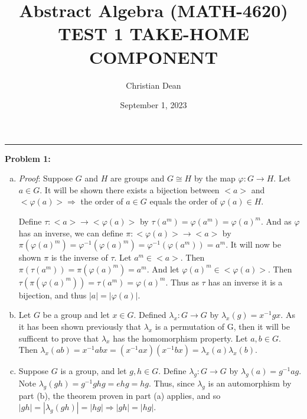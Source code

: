 \documentclass[12pt, letterpaper]{article}
\title{Abstract Algebra (MATH-4620) TEST 1 TAKE-HOME COMPONENT}
\author{Christian Dean}
\date{September 1, 2023}
\newenvironment{problem}
    [1]
    {\noindent \textbf{Problem #1:}}
    {\vspace{3mm}}
\begin{document}
\maketitle

\noindent\hfil\rule{16cm}{0.4pt}\hfil

\begin{problem}{1}
    \begin{enumerate}[(a)]
        \item \emph{Proof}: Suppose $G$ and $H$ are groups and $G \cong H$ by the map
        $\varphi: G \rightarrow H$. Let $a \in G$. It will be shown there exists a bijection 
        between ${<}a{>}$ and ${<}\varphi(a){>} \Rightarrow$ the order of $a \in G$ equals 
        the order of $\varphi(a) \in H$.

        \bigskip\noindent
        Define $\tau: {<}a{>} \rightarrow {<}\varphi(a){>}$ by $\tau(a^m) = \varphi(a^m) =
        \varphi(a)^m$. And as $\varphi$ has an inverse, we can define 
        $\pi: {<}\varphi(a){>} \rightarrow {<}a{>}$ by $\pi(\varphi(a)^m) = 
        \varphi^{-1}(\varphi(a)^m) = \varphi^{-1}(\varphi(a^m)) = a^m$. It will now be shown
        $\pi$ is the inverse of $\tau$. Let $a^{m} \in {<}a{>}$. Then $\pi(\tau(a^m)) =
        \pi(\varphi(a)^m) = a^m$. And let $\varphi(a)^m \in {<}\varphi(a){>}$. Then 
        $\tau(\pi(\varphi(a)^m)) = \tau(a^m) = \varphi(a)^m$. Thus as $\tau$ has an inverse
        it is a bijection, and thus $|a| = |\varphi(a)|$.

        \item Let $G$ be a group and let $x \in G$. Defined $\lambda_x: G \rightarrow G$ by
        $\lambda_x(g) = x^{-1}gx$. As it has been shown previously that $\lambda_x$ is a 
        permutation of G, then it will be sufficent to prove that $\lambda_x$ has the
        homomorphism property. Let $a, b \in G$. Then $\lambda_x(ab) = x^{-1}abx = (x^{-1}ax)
        (x^{-1}bx) = \lambda_x(a)\lambda_x(b)$.

        \item Suppose $G$ is a group, and let $g, h \in G$. Define $\lambda_g: G \rightarrow G$
        by $\lambda_g(a) = g^{-1}ag$. Note $\lambda_g(gh) = g^{-1}ghg = ehg = hg$. Thus, since 
        $\lambda_g$ is an automorphism by part (b), the theorem proven in part (a) applies, and so
        $|gh| = |\lambda_g(gh)| = |hg| \Rightarrow |gh| = |hg|$.
    \end{enumerate}
\end{problem}
\end{document}
